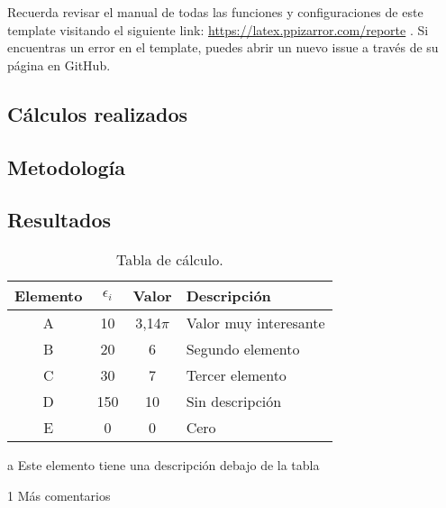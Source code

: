 	Recuerda revisar el manual de todas las funciones y configuraciones de este template visitando el siguiente link: \url{https://latex.ppizarror.com/reporte} \cite{template}. Si encuentras un error en el template, puedes abrir un nuevo issue a través de su página en GitHub.


\clearpage



\begin{appendixd}

	\section{Cálculos realizados}

	\subsection{Metodología}
	\lipsum[1]


	\subsection{Resultados}
	\lipsum[10]

	\enabletablerowcolor[2] %
	\begin{table}[H]
		\begin{threeparttable}
		\centering
		\caption{Tabla de cálculo.}
		\begin{tabular}{cccC{4cm}}
			\hline
			\textbf{Elemento} & $\epsilon_i$ & \textbf{Valor} & \textbf{Descripción} \bigstrut \\
			\hline
			A     & 10    & 3,14$\pi$ & Valor muy interesante \\
			B     & 20    & 6 & Segundo elemento \\
			C     & 30    & 7 & Tercer elemento \\
			D     & 150    & 10 & Sin descripción \\
			E     & 0    & 0 & Cero \\
			\hline
			\end{tabular}
		\begin{tablenotes}
			\item[a] Este elemento tiene una descripción debajo de la tabla
			\item[1] Más comentarios
		\end{tablenotes}
		\end{threeparttable}
		\label{tab:anexo-1}
	\end{table}
	\disabletablerowcolor %
	

\end{appendixd}
